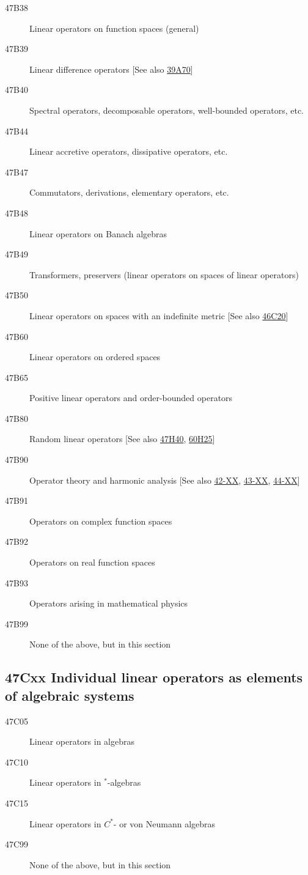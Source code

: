 \begin{description}
\item [47B38]\label{47B38} Linear operators on function spaces (general)
\item [47B39]\label{47B39} Linear difference operators [See also \hyperref[39A70]{39A70}]
\item [47B40]\label{47B40} Spectral operators, decomposable operators, well-bounded operators, etc.
\item [47B44]\label{47B44} Linear accretive operators, dissipative operators, etc.
\item [47B47]\label{47B47} Commutators, derivations, elementary operators, etc.
\item [47B48]\label{47B48} Linear operators on Banach algebras
\item [47B49]\label{47B49} Transformers, preservers (linear operators on spaces of linear operators)
\item [47B50]\label{47B50} Linear operators on spaces with an indefinite metric [See also \hyperref[46C20]{46C20}]
\item [47B60]\label{47B60} Linear operators on ordered spaces
\item [47B65]\label{47B65} Positive linear operators and order-bounded operators
\item [47B80]\label{47B80} Random linear operators [See also \hyperref[47H40]{47H40}, \hyperref[60H25]{60H25}]
\item [47B90]\label{47B90} Operator theory and harmonic analysis [See also \hyperref[42-XX]{42-XX}, \hyperref[43-XX]{43-XX}, \hyperref[44-XX]{44-XX}]
\item [47B91]\label{47B91} Operators on complex function spaces
\item [47B92]\label{47B92} Operators on real function spaces
\item [47B93]\label{47B93} Operators arising in mathematical physics
\item [47B99]\label{47B99} None of the above, but in this section
\end{description}
\subsection*{47Cxx  Individual linear operators as elements of algebraic systems }\label{47Cxx}
\begin{description}  
\item [47C05]\label{47C05} Linear operators in algebras
\item [47C10]\label{47C10} Linear operators in ${}^*$-algebras
\item [47C15]\label{47C15} Linear operators in $C^*$- or von Neumann algebras
\item [47C99]\label{47C99} None of the above, but in this section
\end{description}
